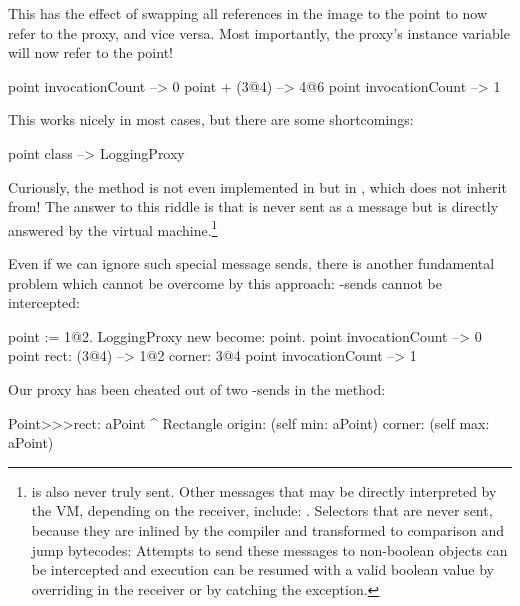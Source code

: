 \documentclass[a4paper,10pt,twoside]{book}
\begin{document}
This has the effect of swapping all references in the image to the point to now refer to the proxy, and vice versa. Most importantly, the proxy's  instance variable will now refer to the point!

\begin{code}{}
point invocationCount --> 0
point + (3@4)             --> 4@6
point invocationCount --> 1
\end{code}

This works nicely in most cases, but there are some shortcomings:
\begin{code}{}
point class --> LoggingProxy
\end{code}
Curiously, the method  is not even implemented in  but in , which  does not inherit from!
The answer to this riddle is that  is never sent as a message but is directly answered by the virtual machine.\footnote{ is also never truly sent.
Other messages that may be directly interpreted by the VM, depending on the receiver, include:
\ct{+- < > <= >= = ~= * / \ ==}
.
Selectors that are never sent, because they are inlined by the compiler and transformed to comparison and jump bytecodes:
Attempts to send these messages to non-boolean objects can be intercepted and execution can be resumed with a valid boolean value by overriding  in the receiver or by catching the  exception.
}%

Even if we can ignore such special message sends, there is another fundamental problem which cannot be overcome by this approach: \self-sends cannot be intercepted:
\begin{code}{}
point := 1@2.
LoggingProxy new become: point.
point invocationCount --> 0
point rect: (3@4)        --> 1@2 corner: 3@4
point invocationCount --> 1
\end{code}

Our proxy has been cheated out of two \self-sends in the  method:
\begin{code}{}
Point>>>rect: aPoint 
	^ Rectangle  origin: (self min: aPoint) corner: (self max: aPoint)
\end{code}
\end{document}
